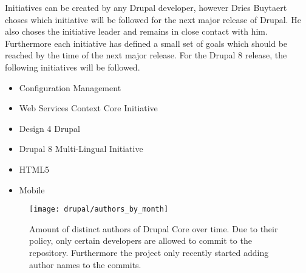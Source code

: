Initiatives can be created by any Drupal developer, however Dries Buytaert
choses which initiative will be followed for the next major release of Drupal.
He also choses the initiative leader and remains in close contact with him.
Furthermore each initiative has defined a small set of goals which should be
reached by the time of the next major release. For the Drupal 8 release, the
following initiatives will be followed.

\begin{itemize}
  \item Configuration Management
  \item Web Services Context Core Initiative
  \item Design 4 Drupal
  \item Drupal 8 Multi-Lingual Initiative
  \item HTML5
  \item Mobile
\end{itemize}

\begin{figure}[htbp]
  \centering
  \texttt{[image: drupal/authors\_by\_month]}
  \caption{Amount of distinct authors of Drupal Core over time. Due to their
  policy, only certain developers are allowed to commit to the repository.
  Furthermore the project only recently started adding author names to the
  commits.}
\end{figure}


